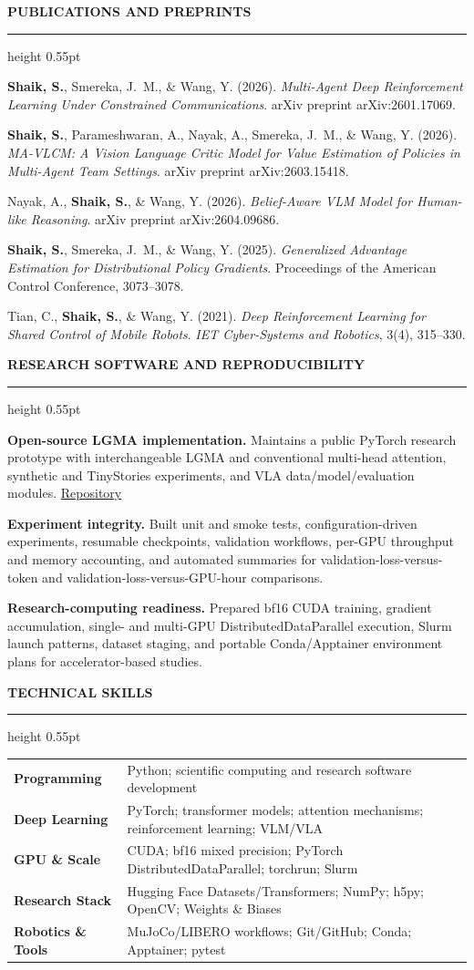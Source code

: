 \documentclass[10pt,letterpaper]{article}
\newcommand{\cvsection}[1]{%
  \vspace{7pt}%
  {\color{navy}\fontsize{10.5}{12}\selectfont\bfseries\MakeUppercase{#1}}\par
  \vspace{2pt}\color{rulegray}\hrule height 0.55pt\color{ink}\vspace{4pt}
}
\newcommand{\pubentry}[4]{%
  \hangindent=0.18in\hangafter=1
  #1 (#2). \textit{#3}. #4\par\vspace{5pt}
}
\newcommand{\skillrow}[2]{%
  {\color{navy}\bfseries #1} & #2\\[2.5pt]
}
\begin{document}
\cvsection{Publications and Preprints}
\pubentry
  {\textbf{\color{navy}Shaik, S.}, Smereka, J.~M., \& Wang, Y.}
  {2026}
  {Multi-Agent Deep Reinforcement Learning Under Constrained Communications}
  {arXiv preprint arXiv:2601.17069.}

\pubentry
  {\textbf{\color{navy}Shaik, S.}, Parameshwaran, A., Nayak, A., Smereka, J.~M., \& Wang, Y.}
  {2026}
  {MA-VLCM: A Vision Language Critic Model for Value Estimation of Policies in Multi-Agent Team Settings}
  {arXiv preprint arXiv:2603.15418.}

\pubentry
  {Nayak, A., \textbf{\color{navy}Shaik, S.}, \& Wang, Y.}
  {2026}
  {Belief-Aware VLM Model for Human-like Reasoning}
  {arXiv preprint arXiv:2604.09686.}

\pubentry
  {\textbf{\color{navy}Shaik, S.}, Smereka, J.~M., \& Wang, Y.}
  {2025}
  {Generalized Advantage Estimation for Distributional Policy Gradients}
  {Proceedings of the American Control Conference, 3073--3078.}

\pubentry
  {Tian, C., \textbf{\color{navy}Shaik, S.}, \& Wang, Y.}
  {2021}
  {Deep Reinforcement Learning for Shared Control of Mobile Robots}
  {\textit{IET Cyber-Systems and Robotics}, 3(4), 315--330.}

\cvsection{Research Software and Reproducibility}
{\color{navy}\bfseries Open-source LGMA implementation.}
Maintains a public PyTorch research prototype with interchangeable LGMA and conventional
multi-head attention, synthetic and TinyStories experiments, and VLA
data/model/evaluation modules.
\href{https://github.com/shahils01/Attention-is-Transformed}{Repository}\par\vspace{5pt}

{\color{navy}\bfseries Experiment integrity.}
Built unit and smoke tests, configuration-driven experiments, resumable checkpoints,
validation workflows, per-GPU throughput and memory accounting, and automated summaries
for validation-loss-versus-token and validation-loss-versus-GPU-hour comparisons.\par\vspace{5pt}

{\color{navy}\bfseries Research-computing readiness.}
Prepared bf16 CUDA training, gradient accumulation, single- and multi-GPU
DistributedDataParallel execution, Slurm launch patterns, dataset staging, and portable
Conda/Apptainer environment plans for accelerator-based studies.

\cvsection{Technical Skills}
\begin{tabularx}{\textwidth}{@{}p{1.48in}X@{}}
\skillrow{Programming}{Python; scientific computing and research software development}
\skillrow{Deep Learning}{PyTorch; transformer models; attention mechanisms; reinforcement learning; VLM/VLA}
\skillrow{GPU \& Scale}{CUDA; bf16 mixed precision; PyTorch DistributedDataParallel; torchrun; Slurm}
\skillrow{Research Stack}{Hugging Face Datasets/Transformers; NumPy; h5py; OpenCV; Weights \& Biases}
\skillrow{Robotics \& Tools}{MuJoCo/LIBERO workflows; Git/GitHub; Conda; Apptainer; pytest}
\end{tabularx}
\end{document}
